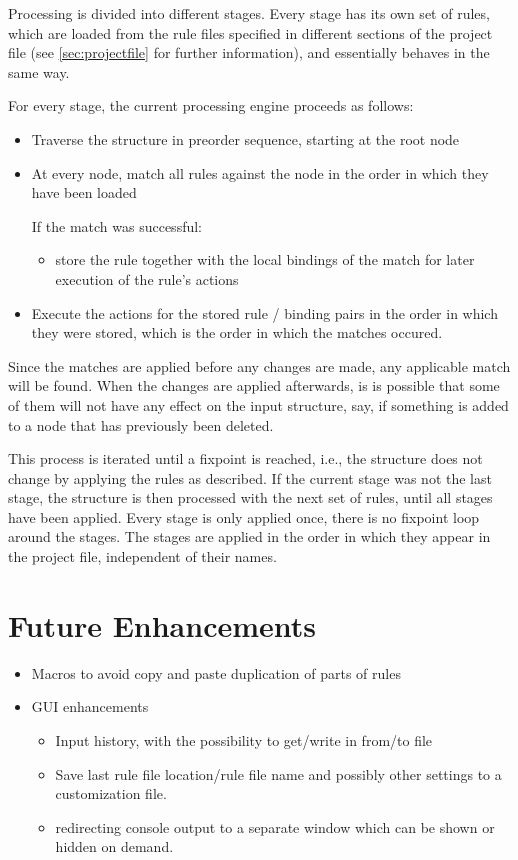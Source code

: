 \documentclass[11pt,a4paper]{article}
\begin{document}
Processing is divided into different stages. Every stage has its own set of
rules, which are loaded from the rule files specified in different sections of
the project file (see \ref{sec:projectfile} for further information), and
essentially behaves in the same way.

For every stage, the current processing engine proceeds as follows:
\begin{itemize}
\item Traverse the structure in preorder sequence, starting at the root node
\item At every node, match all rules against the node in the order in which
  they have been loaded

  \noindent{}If the match was successful:\\[-3.4ex]
  \begin{itemize}
  \item[] store the rule together with the
    local bindings of the match for later execution of the rule's actions
  \end{itemize}
\item Execute the actions for the stored rule / binding pairs in the order in
  which they were stored, which is the order in which the matches occured.
\end{itemize}

Since the matches are applied before any changes are made, any applicable match
will be found. When the changes are applied afterwards, is is possible that
some of them will not have any effect on the input structure, say, if something
is added to a node that has previously been deleted.

This process is iterated until a fixpoint is reached, i.e., the structure does
not change by applying the rules as described. If the current stage was not the
last stage, the structure is then processed with the next set of rules, until
all stages have been applied. Every stage is only applied once, there is no
fixpoint loop around the stages. The stages are applied in the order in which
they appear in the project file, independent of their names.

\section{Future Enhancements}
\begin{itemize}
\item Macros to avoid copy and paste duplication of parts of rules
\item GUI enhancements
  \begin{itemize}
  \item Input history, with the possibility to get/write in from/to file
  \item Save last rule file location/rule file name and possibly other settings
    to a customization file.
  \item redirecting console output to a separate window which can be shown or
    hidden on demand.
  \end{itemize}
\end{itemize}
\fi
\end{document}

